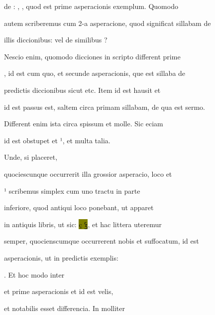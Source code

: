de : , , quod est prime asperacionis exemplum. Quomodo

autem scriberemus  cum 2-a asperacione, quod significat sillabam de

illis diccionibus:    vel de similibus ?

Nescio enim, quomodo dicciones in scripto different  prime 

, id est cum quo, et  secunde asperacionis, que est sillaba de

predictis diccionibus sicut  etc. Item  id est hausit et

 id est passus est, saltem circa primam sillabam, de qua est sermo.

Different enim ista circa  spissum et molle. Sic eciam 

\splitlines

id est obstupet et ¹, et multa talia.

\indentK Unde, si placeret,

\fulllines

quociescunque occurrerit illa grossior asperacio,  loco  et

¹  scribemus simplex  cum uno tractu in parte

inferiore, quod antiqui loco  ponebant, ut apparet

in antiquis libris, ut sic: \colorbox{olive}{ç {\Quivira ꝣ}}, et hac littera uteremur

semper, quocienscumque occurrerent nobis   et  suffocatum, id est 

 asperacionis, ut in predictis exemplis:  

    . Et hoc modo inter 

et  prime asperacionis et  id est velis, 

 et  notabilis esset differencia. In molliter

